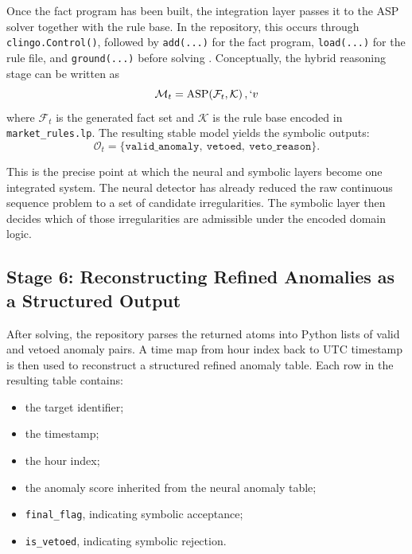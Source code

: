Once the fact program has been built, the integration layer passes it to the ASP solver together with the rule base. In the repository, this occurs through \texttt{clingo.Control()}, followed by \texttt{add(...)} for the fact program, \texttt{load(...)} for the rule file, and \texttt{ground(...)} before solving \cite{repo_thesis_grid_anomaly}. Conceptually, the hybrid reasoning stage can be written as
\begin{equation}
	\mathcal{M}_t = \mathrm{ASP}\!\left(\mathcal{F}_t, \mathcal{K}\right),
	\label{eq:asp_model}
`v  \end{equation}
where $\mathcal{F}_t$ is the generated fact set and $\mathcal{K}$ is the rule base encoded in \texttt{market\_rules.lp}. The resulting stable model yields the symbolic outputs:
\begin{equation}
	\mathcal{O}_t = \{\texttt{valid\_anomaly},\ \texttt{vetoed},\ \texttt{veto\_reason}\}.
	\label{eq:asp_outputs}
\end{equation}

This is the precise point at which the neural and symbolic layers become one integrated system. The neural detector has already reduced the raw continuous sequence problem to a set of candidate irregularities. The symbolic layer then decides which of those irregularities are admissible under the encoded domain logic.

\subsection{Stage 6: Reconstructing Refined Anomalies as a Structured Output}

After solving, the repository parses the returned atoms into Python lists of valid and vetoed anomaly pairs. A time map from hour index back to UTC timestamp is then used to reconstruct a structured refined anomaly table. Each row in the resulting table contains:
\begin{itemize}
	\item the target identifier;
	\item the timestamp;
	\item the hour index;
	\item the anomaly score inherited from the neural anomaly table;
	\item \texttt{final\_flag}, indicating symbolic acceptance;
	\item \texttt{is\_vetoed}, indicating symbolic rejection.
\end{itemize}

